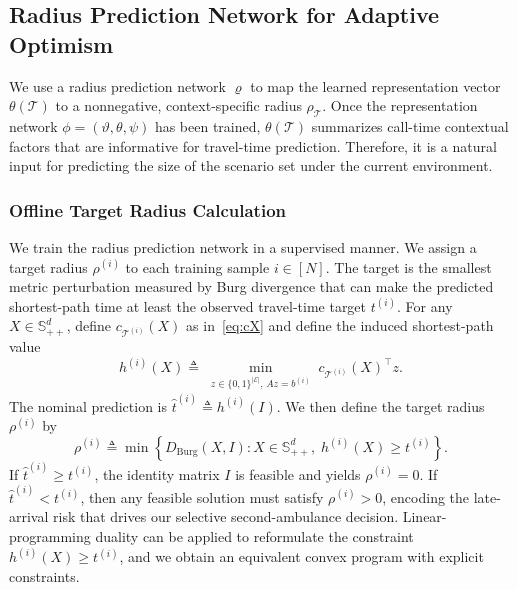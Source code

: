 \documentclass[11pt, letterpaper, oneside, reqno]{amsart}
\newcommand{\Let}{\triangleq}
\begin{document}
\subsection{Radius Prediction Network for Adaptive Optimism}
\label{sec:rho}

We use a radius prediction network $\varrho$ to map the learned representation vector $\theta(\mathcal T)$ to a nonnegative, context-specific radius $\rho_{\mathcal T}$. Once the representation network $\phi=(\vartheta,\theta,\psi)$ has been trained, $\theta(\mathcal T)$ summarizes call-time contextual factors that are informative for travel-time prediction. Therefore, it is a natural input for predicting the size of the scenario set under the current environment. 

\subsubsection{Offline Target Radius Calculation}

We train the radius prediction network in a supervised manner. We assign a target radius $\rho^{(i)}$ to each training sample $i \in [N]$. The target is the smallest metric perturbation measured by Burg divergence that can make the predicted shortest-path time at least the observed travel-time target $t^{(i)}$. For any $X \in \mathbb S_{++}^d$, define $c_{\mathcal T^{(i)}}(X)$ as in~\eqref{eq:cX} and define the induced shortest-path value
\[
h^{(i)}(X)
\Let \min_{\substack{z \in \{0,1\}^{|\mathcal E|},\, A z = b^{(i)}}} c_{\mathcal T^{(i)}}(X)^\top z.
\]
The nominal prediction is $\hat t^{(i)} \Let h^{(i)}(I)$. We then define the target radius $\rho^{(i)}$ by
\begin{equation}
\rho^{(i)}
\Let \min \left\{ D_{\mathrm{Burg}}(X,I) : X \in \mathbb S_{++}^d,\; h^{(i)}(X) \ge t^{(i)} \right\}.
\label{eq:uncertainty-radius}
\end{equation}
If $\hat t^{(i)} \ge t^{(i)}$, the identity matrix $I$ is feasible and yields $\rho^{(i)} = 0$. If $\hat t^{(i)} < t^{(i)}$, then any feasible solution must satisfy $\rho^{(i)} > 0$, encoding the late-arrival risk that drives our selective second-ambulance decision. Linear-programming duality can be applied to reformulate the constraint $h^{(i)}(X) \ge t^{(i)}$, and we obtain an equivalent convex program with explicit constraints.
\end{document}
